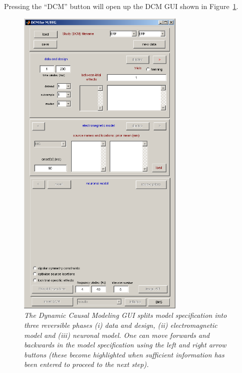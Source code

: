 Pressing the ``DCM'' button will open up the DCM GUI shown in Figure~\ref{dcm_gui}.
\begin{figure}
\begin{center}
\includegraphics[width=80mm]{mmn/dcm_gui}
\caption{\em The Dynamic Causal Modeling GUI splits model specification into three reversible phases (i) data and design, (ii) electromagnetic model and (iii) neuronal model. One can move forwards and backwards in the model specification using the left and right arrow buttons (these become highlighted when sufficient information has been entered to proceed to the next step).
\label{dcm_gui}}
\end{center}
\end{figure}
